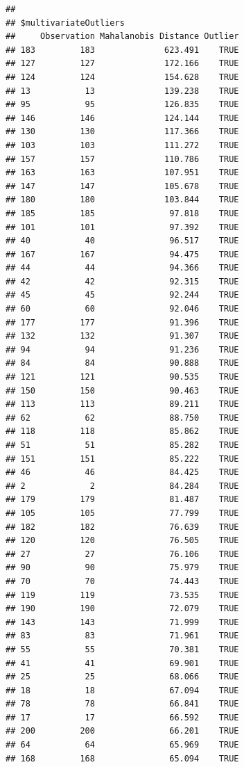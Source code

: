 \documentclass{article}\usepackage[]{graphicx}\usepackage[]{color}
\makeatletter
\newenvironment{kframe}{%
 \def\at@end@of@kframe{}%
 \ifinner\ifhmode%
  \def\at@end@of@kframe{\end{minipage}}%
  \begin{minipage}{\columnwidth}%
 \fi\fi%
 \def\FrameCommand##1{\hskip\@totalleftmargin \hskip-\fboxsep
 \colorbox{shadecolor}{##1}\hskip-\fboxsep
     \hskip-\linewidth \hskip-\@totalleftmargin \hskip\columnwidth}%
 \MakeFramed {\advance\hsize-\width
   \@totalleftmargin\z@ \linewidth\hsize
   \@setminipage}}%
 {\par\unskip\endMakeFramed%
 \at@end@of@kframe}
\newenvironment{knitrout}{}{} %
\makeatother
\begin{document}
\begin{knitrout}
\begin{kframe}
\begin{verbatim}
## 
## $multivariateOutliers
##     Observation Mahalanobis Distance Outlier
## 183         183              623.491    TRUE
## 127         127              172.166    TRUE
## 124         124              154.628    TRUE
## 13           13              139.238    TRUE
## 95           95              126.835    TRUE
## 146         146              124.144    TRUE
## 130         130              117.366    TRUE
## 103         103              111.272    TRUE
## 157         157              110.786    TRUE
## 163         163              107.951    TRUE
## 147         147              105.678    TRUE
## 180         180              103.844    TRUE
## 185         185               97.818    TRUE
## 101         101               97.392    TRUE
## 40           40               96.517    TRUE
## 167         167               94.475    TRUE
## 44           44               94.366    TRUE
## 42           42               92.315    TRUE
## 45           45               92.244    TRUE
## 60           60               92.046    TRUE
## 177         177               91.396    TRUE
## 132         132               91.307    TRUE
## 94           94               91.236    TRUE
## 84           84               90.888    TRUE
## 121         121               90.535    TRUE
## 150         150               90.463    TRUE
## 113         113               89.211    TRUE
## 62           62               88.750    TRUE
## 118         118               85.862    TRUE
## 51           51               85.282    TRUE
## 151         151               85.222    TRUE
## 46           46               84.425    TRUE
## 2             2               84.284    TRUE
## 179         179               81.487    TRUE
## 105         105               77.799    TRUE
## 182         182               76.639    TRUE
## 120         120               76.505    TRUE
## 27           27               76.106    TRUE
## 90           90               75.979    TRUE
## 70           70               74.443    TRUE
## 119         119               73.535    TRUE
## 190         190               72.079    TRUE
## 143         143               71.999    TRUE
## 83           83               71.961    TRUE
## 55           55               70.381    TRUE
## 41           41               69.901    TRUE
## 25           25               68.066    TRUE
## 18           18               67.094    TRUE
## 78           78               66.841    TRUE
## 17           17               66.592    TRUE
## 200         200               66.201    TRUE
## 64           64               65.969    TRUE
## 168         168               65.094    TRUE

\end{verbatim}
\end{kframe}
\end{knitrout}
\end{document}
